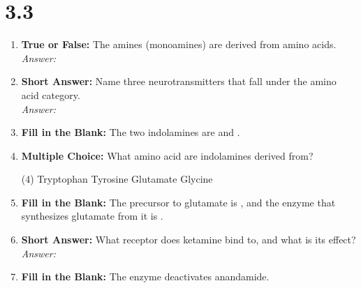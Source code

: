 \squigglyline
\section*{3.3}

\begin{enumerate}[label=\textbf{Q3.3.\arabic*}]
    \item \textbf{True or False:} The amines (monoamines) are derived from amino acids. \\
        \textit{Answer:} %

    \item \textbf{Short Answer:} Name three neurotransmitters that fall under the amino acid category. \\
        \textit{Answer:} %

    \item \textbf{Fill in the Blank:} The two indolamines are \underline{\hspace{3cm}} and \underline{\hspace{3cm}}.

    \item \textbf{Multiple Choice:} What amino acid are indolamines derived from?
        \begin{tasks}[label=\textcolor{\documentTheme}{(\Alph*)}, item-format=\color{\documentTheme}, label-width=1.5em, item-indent=1.7em](4)
            \task Tryptophan
            \task Tyrosine
            \task Glutamate
            \task Glycine
        \end{tasks}
    
    \item \textbf{Fill in the Blank:} The precursor to glutamate is \underline{\hspace{3cm}}, and the enzyme that synthesizes glutamate from it is \underline{\hspace{3cm}}.

    \item \textbf{Short Answer:} What receptor does ketamine bind to, and what is its effect? \\
        \textit{Answer:} %

    \item \textbf{Fill in the Blank:} The enzyme \underline{\hspace{3cm}} deactivates anandamide.


\end{enumerate}
